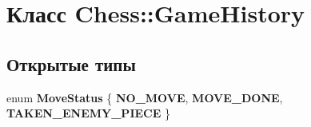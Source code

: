 \hypertarget{class_chess_1_1_game_history}{}\section{Класс Chess\+:\+:Game\+History}
\label{class_chess_1_1_game_history}
\subsection*{Открытые типы}
\begin{DoxyCompactItemize}
\item 
\mbox{\label{class_chess_1_1_game_history_a1e66f8172e7db7d2f05a5b8c87d1ba0f}} 
enum {\bfseries Move\+Status} \{ {\bfseries N\+O\+\_\+\+M\+O\+VE}, 
{\bfseries M\+O\+V\+E\+\_\+\+D\+O\+NE}, 
{\bfseries T\+A\+K\+E\+N\+\_\+\+E\+N\+E\+M\+Y\+\_\+\+P\+I\+E\+CE}
 \}
\end{DoxyCompactItemize}
